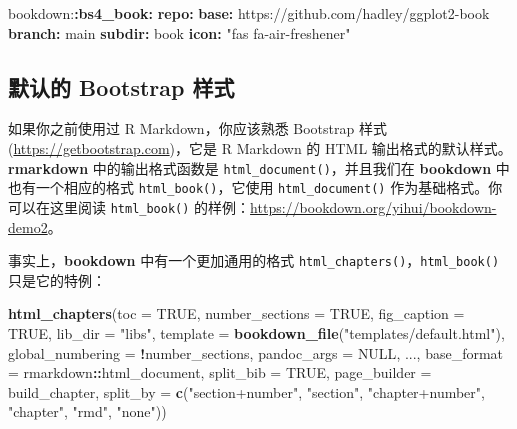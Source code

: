 \documentclass[
  12pt,
]{krantz}
\newenvironment{Shaded}{\begin{snugshade}}{\end{snugshade}}
\newcommand{\AttributeTok}[1]{\textcolor[rgb]{0.13,0.29,0.53}{#1}}
\newcommand{\ConstantTok}[1]{\textcolor[rgb]{0.56,0.35,0.01}{#1}}
\newcommand{\FunctionTok}[1]{\textcolor[rgb]{0.13,0.29,0.53}{\textbf{#1}}}
\newcommand{\KeywordTok}[1]{\textcolor[rgb]{0.13,0.29,0.53}{\textbf{#1}}}
\newcommand{\NormalTok}[1]{#1}
\newcommand{\SpecialCharTok}[1]{\textcolor[rgb]{0.81,0.36,0.00}{\textbf{#1}}}
\newcommand{\StringTok}[1]{\textcolor[rgb]{0.31,0.60,0.02}{#1}}
\theoremstyle{definition}
\theoremstyle{definition}
\theoremstyle{definition}
\theoremstyle{definition}
\theoremstyle{remark}
\begin{document}
\begin{Shaded}
\begin{Highlighting}[]
\AttributeTok{bookdown:}\FunctionTok{:bs4\_book}\KeywordTok{:}
\AttributeTok{  }\FunctionTok{repo}\KeywordTok{:}
\AttributeTok{    }\FunctionTok{base}\KeywordTok{:}\AttributeTok{ https://github.com/hadley/ggplot2{-}book}
\AttributeTok{    }\FunctionTok{branch}\KeywordTok{:}\AttributeTok{ main}
\AttributeTok{    }\FunctionTok{subdir}\KeywordTok{:}\AttributeTok{ book}
\AttributeTok{    }\FunctionTok{icon}\KeywordTok{:}\AttributeTok{ }\StringTok{"fas fa{-}air{-}freshener"}
\end{Highlighting}
\end{Shaded}

\subsection{默认的 Bootstrap 样式}\label{bootstrap-style}

如果你之前使用过 R Markdown，你应该熟悉 Bootstrap 样式 (\url{https://getbootstrap.com})，它是 R Markdown 的 HTML 输出格式的默认样式。\textbf{rmarkdown} 中的输出格式函数是 \texttt{html\_document()}，并且我们在 \textbf{bookdown} 中也有一个相应的格式 \texttt{html\_book()}，它使用 \texttt{html\_document()} 作为基础格式。你可以在这里阅读 \texttt{html\_book()} 的样例：\url{https://bookdown.org/yihui/bookdown-demo2}。

事实上，\textbf{bookdown} 中有一个更加通用的格式 \texttt{html\_chapters()}，\texttt{html\_book()} 只是它的特例：

\begin{Shaded}
\begin{Highlighting}[]
\FunctionTok{html\_chapters}\NormalTok{(}\AttributeTok{toc =} \ConstantTok{TRUE}\NormalTok{, }\AttributeTok{number\_sections =} \ConstantTok{TRUE}\NormalTok{,}
  \AttributeTok{fig\_caption =} \ConstantTok{TRUE}\NormalTok{, }\AttributeTok{lib\_dir =} \StringTok{"libs"}\NormalTok{,}
  \AttributeTok{template =} \FunctionTok{bookdown\_file}\NormalTok{(}\StringTok{"templates/default.html"}\NormalTok{),}
  \AttributeTok{global\_numbering =} \SpecialCharTok{!}\NormalTok{number\_sections,}
  \AttributeTok{pandoc\_args =} \ConstantTok{NULL}\NormalTok{, ...,}
  \AttributeTok{base\_format =}\NormalTok{ rmarkdown}\SpecialCharTok{::}\NormalTok{html\_document,}
  \AttributeTok{split\_bib =} \ConstantTok{TRUE}\NormalTok{, }\AttributeTok{page\_builder =}\NormalTok{ build\_chapter,}
  \AttributeTok{split\_by =} \FunctionTok{c}\NormalTok{(}\StringTok{"section+number"}\NormalTok{, }\StringTok{"section"}\NormalTok{, }\StringTok{"chapter+number"}\NormalTok{, }\StringTok{"chapter"}\NormalTok{, }\StringTok{"rmd"}\NormalTok{, }\StringTok{"none"}\NormalTok{))}
\end{Highlighting}
\end{Shaded}
\end{document}
